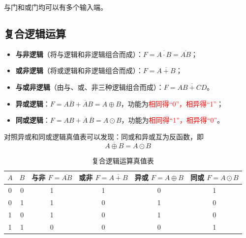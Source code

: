 \begin{note}
	与门和或门均可以有多个输入端。
\end{note}

\subsection{复合逻辑运算}
\label{sec:复合逻辑运算}

\begin{definition}[与非逻辑与或非逻辑]
\label{def:与非或非}
\begin{itemize}
	\item \textbf{与非逻辑}（将与逻辑和非逻辑组合而成）：$F=\overline{A\cdot B}=\overline{AB}$；
	\item \textbf{或非逻辑}（将或逻辑和非逻辑组合而成）：$F=\overline{A+B}$；
	\item \textbf{与或非逻辑}（由与、或、非三种逻辑组合而成）：$F=\overline{AB+CD}$。
\end{itemize}
\end{definition}

\begin{definition}[异或逻辑与同或逻辑]
\label{def:异或同或}
\begin{itemize}
	\item \textbf{异或逻辑}：$F=A\overline{B}+\overline{A}B=A\oplus B$，功能为\textcolor{red}{相同得“0”，相异得“1”}；
	\item \textbf{同或逻辑}：$F=AB+\overline{A}\,\overline{B}=A\odot B$，功能为\textcolor{red}{相同得“1”，相异得“0”}。
\end{itemize}
对照异或和同或逻辑真值表可以发现：同或和异或互为反函数，即
\begin{equation}
	\overline{A\oplus B}=A\odot B
	\label{eq:复合:异或同或互为反}
\end{equation}
\end{definition}

\begin{table}[H]
\centering
\caption{复合逻辑运算真值表}
\label{tab:真值表:复合运算}
\begin{tabular}{cc|cccc}
	\toprule
	$A$ & $B$ & 与非 $F=\overline{AB}$ & 或非 $F=\overline{A+B}$ & 异或 $F=A\oplus B$ & 同或 $F=A\odot B$ \\
	\midrule
	0 & 0 & 1 & 1 & 0 & 1 \\
	0 & 1 & 1 & 0 & 1 & 0 \\
	1 & 0 & 1 & 0 & 1 & 0 \\
	1 & 1 & 0 & 0 & 0 & 1 \\
	\bottomrule
\end{tabular}
\end{table}

